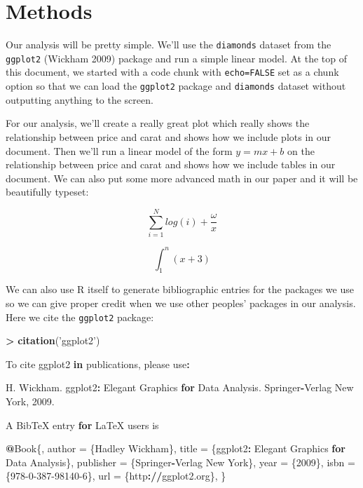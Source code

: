 \documentclass[
]{article}
\newenvironment{Shaded}{\begin{snugshade}}{\end{snugshade}}
\newcommand{\ControlFlowTok}[1]{\textcolor[rgb]{0.13,0.29,0.53}{\textbf{#1}}}
\newcommand{\DecValTok}[1]{\textcolor[rgb]{0.00,0.00,0.81}{#1}}
\newcommand{\ErrorTok}[1]{\textcolor[rgb]{0.64,0.00,0.00}{\textbf{#1}}}
\newcommand{\FloatTok}[1]{\textcolor[rgb]{0.00,0.00,0.81}{#1}}
\newcommand{\KeywordTok}[1]{\textcolor[rgb]{0.13,0.29,0.53}{\textbf{#1}}}
\newcommand{\NormalTok}[1]{#1}
\newcommand{\OperatorTok}[1]{\textcolor[rgb]{0.81,0.36,0.00}{\textbf{#1}}}
\newcommand{\StringTok}[1]{\textcolor[rgb]{0.31,0.60,0.02}{#1}}
\begin{document}
\hypertarget{methods}{%
\section{Methods}\label{methods}}

Our analysis will be pretty simple. We'll use the \texttt{diamonds}
dataset from the \texttt{ggplot2} (Wickham 2009) package and run a
simple linear model. At the top of this document, we started with a code
chunk with \texttt{echo=FALSE} set as a chunk option so that we can load
the \texttt{ggplot2} package and \texttt{diamonds} dataset without
outputting anything to the screen.

For our analysis, we'll create a really great plot which really shows
the relationship between price and carat and shows how we include plots
in our document. Then we'll run a linear model of the form
\(y = mx + b\) on the relationship between price and carat and shows how
we include tables in our document. We can also put some more advanced
math in our paper and it will be beautifully typeset:

\[\sum_{i=1}^{N}{log(i) + \frac{\omega}{x}}\]

\[\int_{1}^{n}(x+3)\]

We can also use R itself to generate bibliographic entries for the
packages we use so we can give proper credit when we use other peoples'
packages in our analysis. Here we cite the \texttt{ggplot2} package:

\begin{Shaded}
\begin{Highlighting}[]
\OperatorTok{>}\StringTok{ }\KeywordTok{citation}\NormalTok{(}\StringTok{'ggplot2'}\NormalTok{)}

\NormalTok{To cite ggplot2 }\ControlFlowTok{in}\NormalTok{ publications, please use}\OperatorTok{:}

\StringTok{  }\NormalTok{H. Wickham. ggplot2}\OperatorTok{:}\StringTok{ }\NormalTok{Elegant Graphics }\ControlFlowTok{for}\NormalTok{ Data Analysis. Springer}\OperatorTok{-}\NormalTok{Verlag New York, }\FloatTok{2009.}

\NormalTok{A BibTeX entry }\ControlFlowTok{for}\NormalTok{ LaTeX users is}

  \OperatorTok{@}\NormalTok{Book\{,}
\NormalTok{    author =}\StringTok{ }\NormalTok{\{Hadley Wickham\},}
\NormalTok{    title =}\StringTok{ }\NormalTok{\{ggplot2}\OperatorTok{:}\StringTok{ }\NormalTok{Elegant Graphics }\ControlFlowTok{for}\NormalTok{ Data Analysis\},}
\NormalTok{    publisher =}\StringTok{ }\NormalTok{\{Springer}\OperatorTok{-}\NormalTok{Verlag New York\},}
\NormalTok{    year =}\StringTok{ }\NormalTok{\{}\DecValTok{2009}\NormalTok{\},}
\NormalTok{    isbn =}\StringTok{ }\NormalTok{\{}\DecValTok{978-0-387-98140-6}\NormalTok{\},}
\NormalTok{    url =}\StringTok{ }\NormalTok{\{http}\OperatorTok{:}\ErrorTok{//}\NormalTok{ggplot2.org\},}
\NormalTok{  \}}
\end{Highlighting}
\end{Shaded}
\end{document}
